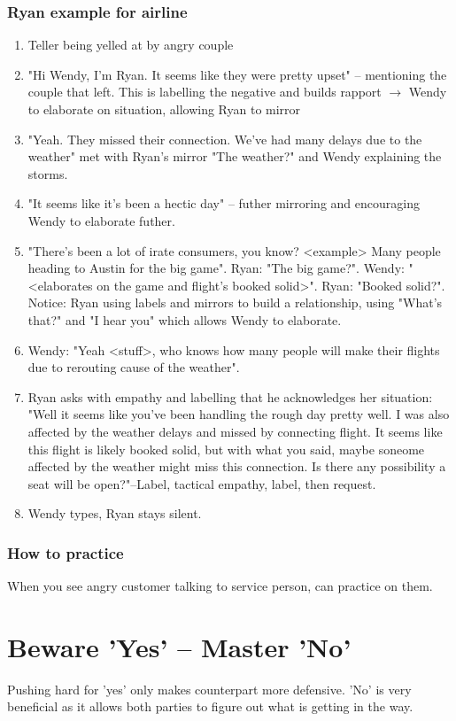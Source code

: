 \documentclass{summary}
\begin{document}
\subsubsection*{Ryan example for airline}
\begin{enumerate}
  \item Teller being yelled at by angry couple
  \item "Hi Wendy, I'm Ryan. It seems like they were pretty upset" -- mentioning the couple that left. This is labelling the negative and builds rapport $\rightarrow$ Wendy to elaborate on situation, allowing Ryan to mirror
  \item "Yeah. They missed their connection. We've had many delays due to the weather" met with Ryan's mirror "The weather?" and Wendy explaining the storms.
  \item "It seems like it's been a hectic day" -- futher mirroring and encouraging Wendy to elaborate futher.
  \item "There's been a lot of irate consumers, you know? <example> Many people heading to Austin for the big game". Ryan: "The big game?". Wendy: "<elaborates on the game and flight's booked solid>". Ryan: "Booked solid?". Notice: Ryan using labels and mirrors to build a relationship, using "What's that?" and "I hear you" which allows Wendy to elaborate.
  \item Wendy: "Yeah <stuff>, who knows how many people will make their flights due to rerouting cause of the weather".
  \item Ryan asks with empathy and labelling that he acknowledges her situation: "Well it seems like you've been handling the rough day pretty well. I was also affected by the weather delays and missed by connecting flight. It seems like this flight is likely booked solid, but with what you said, maybe soneome affected by the weather might miss this connection. Is there any possibility a seat will be open?"--Label, tactical empathy, label, then request.
  \item Wendy types, Ryan stays silent.
\end{enumerate}
\subsubsection*{How to practice}
When you see angry customer talking to service person, can practice on them.
\section{Beware 'Yes' -- Master 'No'}
Pushing hard for 'yes' only makes counterpart more defensive. 'No' is very beneficial as it allows both parties to figure out what is getting in the way.
\end{document}
